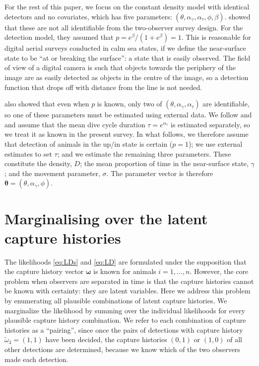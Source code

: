 \documentclass[useAMS, usenatbib, referee]{biom}\usepackage[]{graphicx}\usepackage[]{color}
\newcommand{\dotomega}{\tilde{\omega}}
\begin{document}
For the rest of this paper, we focus on the constant density model with identical detectors and no covariates, which has five parameters: $(\theta,\alpha_\gamma,\alpha_\tau, \phi, \beta)$. \cite{Stevenson+al:19} showed that these are not all identifiable from the two-observer survey design. For the detection model, they assumed that $p=e^\beta/(1+e^\beta)=1$. This is reasonable for digital aerial surveys conducted in calm sea states, if we define the near-surface state to be ``at or breaking the surface'': a state that is easily observed. The field of view of a digital camera is such that objects towards the periphery of the image are as easily detected as objects in the centre of the image, so a detection function that drops off with distance from the line is not needed.

\cite{Stevenson+al:19} also showed that even when $p$ is known, only two of $(\theta,\alpha_\gamma,\alpha_\tau)$ are identifiable, so one of these parameters must be estimated using external data. We follow \cite{Stevenson+al:19} and \cite{Hiby+Lovell:98} and assume that the mean dive cycle duration $\tau=e^{\alpha_\tau}$ is estimated separately, so we treat it as known in the present survey. In what follows, we therefore assume that detection of animals in the up/in state is certain ($p=1$); we use external estimates to set $\tau$; and we estimate the remaining three parameters. These constitute the density, $D$; the mean proportion of time in the near-surface state, $\gamma$; and the movement parameter, $\sigma$. The parameter vector is therefore $\bm{\theta}=(\theta,\alpha_\gamma, \phi)$.



\section{Marginalising over the latent capture histories}

The likelihoods \eqref{eq:LDs} and \eqref{eq:LD} are formulated under the supposition that the capture history vector $\bm{\omega}$ is known for animals $i=1, \ldots, n$. However, the core problem when observers are separated in time is that the capture histories cannot be known with certainty: they are latent variables. Here we address this problem by enumerating all plausible combinations of latent capture histories. We marginalize the likelihood by summing over the individual likelihoods for every plausible capture history combination. We refer to each combination of capture histories as a ``pairing'', since once the pairs of detections with capture history $\dotomega_3=(1,1)$ have been decided, the capture histories $(0, 1)$ or $(1, 0)$ of all other detections are determined, because we know which of the two observers made each detection.
\end{document}
